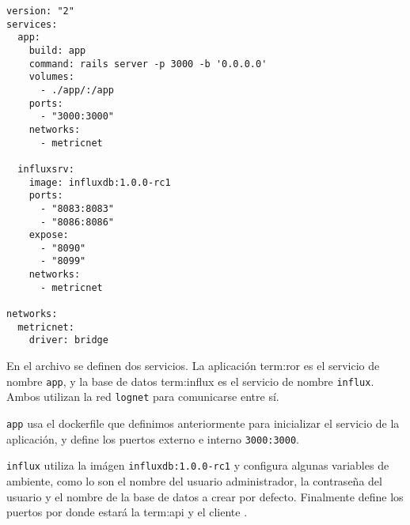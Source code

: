\begin{lstlisting}
version: "2"
services:
  app:
    build: app
    command: rails server -p 3000 -b '0.0.0.0'
    volumes:
      - ./app/:/app
    ports:
      - "3000:3000"
    networks:
      - metricnet

  influxsrv:
    image: influxdb:1.0.0-rc1
    ports:
      - "8083:8083"
      - "8086:8086"
    expose:
      - "8090"
      - "8099"
    networks:
      - metricnet

networks:
  metricnet:
    driver: bridge
\end{lstlisting}

En el archivo se definen dos servicios. La aplicación \gls{term:ror} es el
servicio de nombre \lstinline{app}, y la base de datos \gls{term:influx} es el
servicio de nombre \lstinline{influx}. Ambos utilizan la red \lstinline{lognet}
para comunicarse entre sí.

\lstinline{app} usa el dockerfile que definimos anteriormente para inicializar
el servicio de la aplicación, y define los puertos externo e interno
\lstinline{3000:3000}.

\lstinline{influx} utiliza la imágen \lstinline{influxdb:1.0.0-rc1} y configura
algunas variables de ambiente, como lo son el nombre del usuario administrador,
la contraseña del usuario y el nombre de la base de datos a crear por defecto.
Finalmente define los puertos por donde estará la \gls{term:api} y el cliente
.
